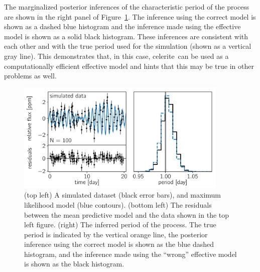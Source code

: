 \documentclass[manuscript, letterpaper]{aastex6}
\makeatletter
\let\origsubsection\subsection
\renewcommand\subsection{\@ifstar{\starsubsection}{\nostarsubsection}}
\newcommand\nostarsubsection[1]{\subsectionprelude\origsubsection{#1}}
\newcommand\starsubsection[1]{\subsectionprelude\origsubsection*{#1}}
\newcommand\subsectionprelude{\vspace{1em}}
\newcommand{\project}[1]{\textsf{#1}}
\newcommand{\celerite}{\project{celerite}}
\newcommand{\figureref}[1]{\ref{fig:#1}}
\newcommand{\Figure}[1]{Figure~\figureref{#1}}
\newcommand{\figurelabel}[1]{\label{fig:#1}}
\newcommand{\sectlabel}[1]{\label{sect:#1}}
\makeatother
\begin{document}
{The marginalized posterior inferences of the characteristic period of the
process are shown in the right panel of \Figure{simulated-wrong}.
The inference using the correct model is shown as a dashed blue histogram and
the inference made using the effective model is shown as a solid black
histogram.
These inferences are consistent with each other and with the true period used
for the simulation (shown as a vertical gray line).
This demonstrates that, in this case, \celerite\ can be used as a
computationally efficient effective model and hints that this may be true in
other problems as well.
}



\begin{figure}[!htbp]
\begin{center}
\includegraphics[width=0.9\textwidth]{figures/simulated/wrong-qpo.pdf}
\caption{(top left) A simulated dataset (black error bars), and maximum
    likelihood model (blue contours).
    (bottom left) The residuals between the mean predictive model and the data
    shown in the top left figure.
    (right) The inferred period of the process. The true period is indicated
    by the vertical orange line, the posterior inference using the correct
    model is shown as the blue dashed histogram, and the inference made using
    the ``wrong'' effective model is shown as the black histogram.
    \figurelabel{simulated-wrong}}
\end{center}
\end{figure}


\subsection{Stellar rotation} \sectlabel{rotation}
\end{document}
